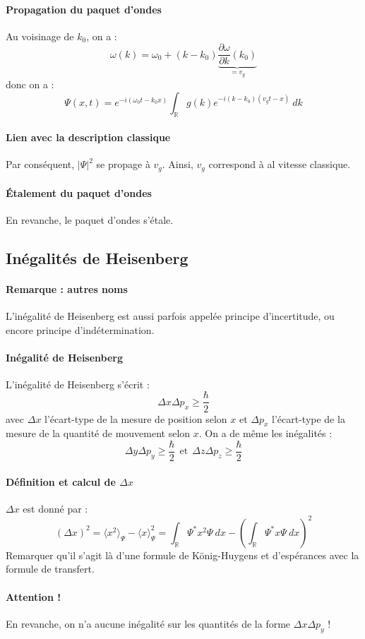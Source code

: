 \documentclass[french]{book}
\theoremstyle{plain}
\theoremstyle{definition}
\theoremstyle{remark}
\newcommand{\R}{\mathbb{R}}
\newcommand{\st}{^*}
\begin{document}
\paragraph{Propagation du paquet d'ondes}
Au voisinage de $k_0$, on a : $$\omega(k)=\omega_0+(k-k_0)\underbrace{\frac{\partial\omega}{\partial k}(k_0)}_{=v_g}$$ donc on a : $$\Psi(x,t)=e^{-i(\omega_0 t-k_0 x)}\int_\R g(k)e^{-i(k-k_0)(v_gt-x)} \ dk$$
\paragraph{Lien avec la description classique} Par conséquent, $\lvert\Psi\rvert^2$ se propage à $v_g$. Ainsi, $v_g$ correspond à al vitesse classique.
\paragraph{Étalement du paquet d'ondes} En revanche, le paquet d'ondes s'étale.
\subsection{Inégalités de Heisenberg}
\paragraph{Remarque : autres noms} L'inégalité de Heisenberg est aussi parfois appelée principe d'incertitude, ou encore principe d'indétermination.
\paragraph{Inégalité de Heisenberg} L'inégalité de Heisenberg s'écrit : $$\Delta x\Delta p_x\geqslant \frac{\hbar}{2}$$ avec $\Delta x$ l'écart-type de la mesure de position selon $x$ et $\Delta p_x$ l'écart-type de la mesure de la quantité de mouvement selon $x$. On a de même les inégalités : $$\Delta y\Delta p_y\geqslant \frac{\hbar}{2} \ \ \text{et} \ \ \Delta z\Delta p_z\geqslant \frac{\hbar}{2}$$
\paragraph{Définition et calcul de $\Delta x$} $\Delta x$ est donné par : $$\left(\Delta x\right)^2=\langle x^2\rangle_\Psi-\langle x\rangle_\Psi^2=\int_\R\Psi\st x^2\Psi \ dx-\left(\int_\R \Psi\st x\Psi \ dx\right)^2$$ Remarquer qu'il s'agit là d'une formule de König-Huygens et d'espérances avec la formule de transfert.
\paragraph{Attention !} En revanche, on n'a aucune inégalité sur les quantités de la forme $\Delta x\Delta p_y$ !
\end{document}
